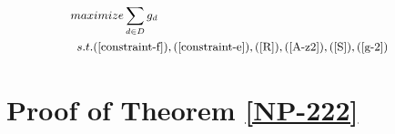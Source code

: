 \documentclass[sigconf]{acmart}
\begin{document}
\begin{appendices}
%







\begin{equation}
\small
\begin{aligned} \label{P8}
 &maximize  \sum_{d\in D} g_d\\
&\begin{array}{r@{\quad}r@{}l@{\quad}l}
s.t.
(\ref{constraint-f}), (\ref{constraint-e}), (\ref{R}), (\ref{A-z2}), (\ref{S}), (\ref{g-2})
\end{array}
\end{aligned}
\end{equation}
\section{Proof of Theorem \ref{NP-222}} \label{appendix-proof}


\end{appendices}
\end{document}

